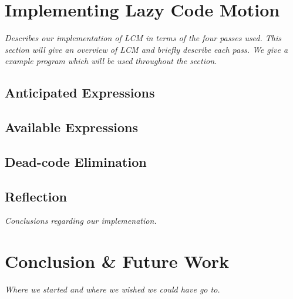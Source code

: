 \documentclass[12pt]{report}
\begin{document}
\chapter{Implementing Lazy Code Motion}
\emph{Describes our implementation of LCM in terms of the four passes
  used. This section will give an overview of LCM and briefly describe
  each pass. We give a example program which will be used throughout
  the section.}

\section{Anticipated Expressions}

\section{Available Expressions}

\section{Dead-code Elimination}

\section{Reflection}

\emph{Conclusions regarding our implemenation.}

\chapter{Conclusion \& Future Work}

\emph{Where we started and where we wished we could have go to.}
\end{document}
